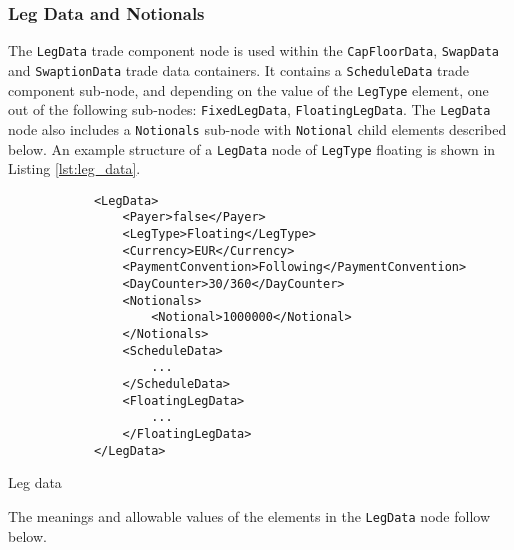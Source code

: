 \subsubsection{Leg Data and Notionals}
\label{ss:leg_data}

The \lstinline!LegData! trade component node is used within the
\lstinline!CapFloorData!,  \lstinline!SwapData! and
\lstinline!SwaptionData! trade data containers. It contains a
\lstinline!ScheduleData! trade component sub-node, and depending on
the value of the \lstinline!LegType! element, one out of the following
sub-nodes:  \lstinline!FixedLegData!, \lstinline!FloatingLegData!. The
\lstinline!LegData! node also includes a \lstinline!Notionals!
sub-node  with \lstinline!Notional! child elements described below. An
example structure of a \lstinline!LegData! node of \lstinline!LegType!
floating is shown in Listing \ref{lst:leg_data}.

\begin{listing}[H]
\begin{verbatim}
            <LegData>
                <Payer>false</Payer>
                <LegType>Floating</LegType>
                <Currency>EUR</Currency>
                <PaymentConvention>Following</PaymentConvention>
                <DayCounter>30/360</DayCounter>
                <Notionals>
                    <Notional>1000000</Notional>
                </Notionals>
                <ScheduleData>
                    ...
                </ScheduleData>
                <FloatingLegData>
                    ...
                </FloatingLegData>
            </LegData>
\end{verbatim}
\caption{Leg data}
\label{lst:leg_data}
\end{listing}

The meanings and allowable values of the elements in the \lstinline!LegData! node follow below.

